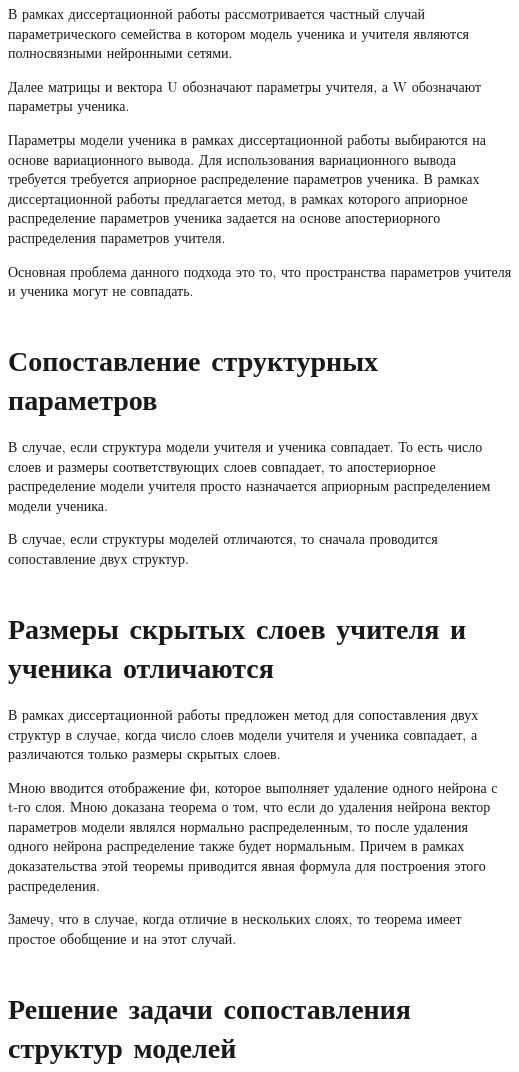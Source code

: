 \documentclass[10pt, twoside]{article}
\begin{document}
В рамках диссертационной работы рассмотривается частный случай параметрического семейства в котором модель ученика и учителя являются полносвязными нейронными сетями.

Далее матрицы и вектора U обозначают параметры учителя, а W обозначают параметры ученика.

Параметры модели ученика в рамках диссертационной работы выбираются на основе вариационного вывода. Для использования вариационного вывода требуется требуется априорное распределение параметров ученика. В рамках диссертационной работы предлагается метод, в рамках которого априорное распределение параметров ученика задается  на основе апостериорного распределения параметров учителя.

Основная проблема данного подхода это то, что пространства параметров учителя и ученика могут не совпадать.

\section{Сопоставление структурных параметров}
В случае, если структура модели учителя и ученика совпадает. То есть число слоев и размеры соответствующих слоев совпадает, то апостериорное распределение модели учителя просто назначается априорным распределением модели ученика.

В случае, если структуры моделей отличаются, то сначала проводится сопоставление двух структур.

\section{Размеры скрытых слоев учителя и ученика отличаются}
В рамках диссертационной работы предложен метод для сопоставления двух структур в случае, когда число слоев модели учителя и ученика совпадает, а различаются только размеры скрытых слоев.

Мною вводится отображение фи, которое выполняет удаление одного нейрона с t-го слоя.
Мною доказана теорема о том, что если до удаления нейрона вектор параметров модели являлся нормально распределенным, то после удаления одного нейрона распределение также будет нормальным. Причем в рамках доказательства этой теоремы приводится явная формула для построения этого распределения.

Замечу, что в случае, когда отличие в нескольких слоях, то теорема имеет простое обобщение и на этот случай.

\section{Решение задачи сопоставления структур моделей}
\end{document}
